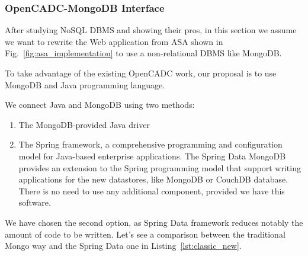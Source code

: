 \subsubsection{OpenCADC-MongoDB Interface}


After studying NoSQL DBMS and showing their pros, in this section we assume we want to rewrite the Web application from ASA shown in Fig.~\ref{fig:asa_implementation} to use a non-relational DBMS like MongoDB.

To take advantage of the existing OpenCADC work, our proposal is to use MongoDB and Java programming language.

We connect Java and MongoDB using two methods:

\begin{enumerate}

\item The MongoDB-provided Java driver 

\item The Spring framework, a comprehensive programming and configuration model for Java-based enterprise applications. The Spring Data MongoDB  provides an extension to the Spring programming model that support writing applications for the new datastores, like MongoDB or CouchDB database. There is no need to use any additional component, provided we have this software.

\end{enumerate}

We have chosen the second option, as Spring Data framework reduces notably the amount of code to be written. Let's see a comparison between the traditional Mongo way and the Spring Data one in Listing~\ref{lst:classic_new}.

